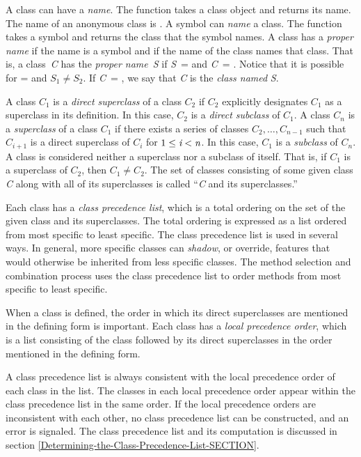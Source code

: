 A class can have a \emph{name}. The function  takes a
class object and returns its name. The name of an anonymous class is
.  A symbol can \emph{name} a class.  The function 
 takes a symbol and returns the class that the symbol
names. A class has a \emph{proper name} if the name is a symbol
and if the name of the class
names that class.  That is, a class~\emph{C} has the \emph{proper
name}~\emph{S} if \emph{S}~=  and \emph{C}~= .  Notice that it is possible for 
=  and $S_1\neq S_2$.
If \emph{C}~= , we say that \emph{C} is the \emph{class named}
\emph{S}.

A class $C_{1}$ is a \emph{direct superclass} of a class
$C_{2}$ if $C_{2}$ explicitly designates $C_{1}$ as a
superclass in its definition.  In this case, $C_{2}$ is a \emph{direct
  subclass} of $C_{1}$.  A class $C_{n}$ is a \emph{superclass} of a
class $C_{1}$ if there exists a series of 
classes $C_{2},\ldots,C_{n-1}$
such that $C_{i+1}$ is a
direct superclass of $C_{i}$ for $1 \leq \emph{i} < \emph{n}$.  In this case, 
$C_{1}$ is a \emph{subclass} of $C_{n}$.  A class is
considered neither a superclass nor a subclass of itself.  That is, if
$C_{1}$ is a superclass of $C_{2}$, then $C_{1} \neq
C_{2}$.  The set of classes consisting of some given
class \emph{C} along with all of its superclasses is called ``\emph{C} and its
superclasses.''

Each class has a \emph{class precedence list}, which is a total ordering
on the set of the given class and its superclasses.  The total ordering
is expressed as a list ordered from most specific to least specific.
The class precedence list is used in several ways.  In general, more
specific classes can \emph{shadow}, or override, features that would
otherwise be inherited from less specific classes.  The method selection
and combination process uses the class precedence list to order methods
from most specific to least specific. 
 
When a class is defined, the order in which its direct superclasses
are mentioned in the defining form is important.  Each class has a
\emph{local precedence order}, which is a list consisting of the
class followed by its direct superclasses in the order mentioned
in the defining form.

A class precedence list is always consistent with the local precedence
order of each class in the list.  The classes in each local precedence
order appear within the class precedence list in the same order.  If
the local precedence orders are inconsistent with each other, no class
precedence list can be constructed, and an error is signaled.
The class precedence list and its computation is discussed
in section \ref{Determining-the-Class-Precedence-List-SECTION}.

